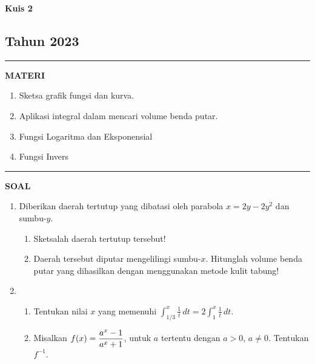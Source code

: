 \begin{flushright}
    \textbf{\Large{Kuis 2}}
    \subsection*{Tahun 2023}
\end{flushright}


\vspace{0.5cm}\hrule height 2pt\vspace{0.5cm}


\begin{center}
\textbf{\large{MATERI}}
\begin{enumerate}[leftmargin=*, label={\arabic*}.]
\item Sketsa grafik fungsi dan kurva.
\item Aplikasi integral dalam mencari volume benda putar.
\item Fungsi Logaritma dan Eksponensial
\item Fungsi Invers
\end{enumerate}
\end{center}


\vspace{0.2cm}\hrule height 1pt\vspace{0.5cm}


\begin{center}
\textbf{\large{SOAL}}
\end{center}
\begin{enumerate}[leftmargin=*, label={\arabic*}.]
\item Diberikan daerah tertutup yang dibatasi oleh parabola $x=2y-2y^{2}$ 
dan sumbu-$y$.
    \begin{enumerate}[label={\alph*}.]
    \item Sketsalah daerah tertutup tersebut!
    \item Daerah tersebut diputar mengelilingi sumbu-$x$. Hitunglah volume 
    benda putar yang dihasilkan dengan menggunakan metode kulit tabung!
    \end{enumerate}
\item 
    \begin{enumerate}[label={\alph*}.]
    \item Tentukan nilai $x$ yang memenuhi 
    $\int_{1/3}^{x}\frac{1}{t}\,dt=2\int_{1}^{x}\frac{1}{t}\,dt$.
    \item Misalkan $\displaystyle f(x)=\frac{a^{x}-1}{a^{x}+1}$, untuk $a$ tertentu dengan $a > 0$, $a\neq 0$.
    Tentukan $f^{-1}$.
    \end{enumerate}
\end{enumerate}


